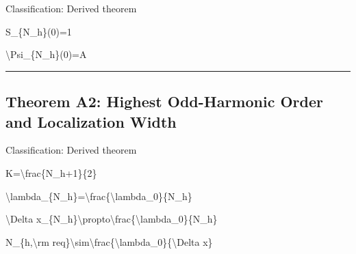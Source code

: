 \documentclass[
  a4paper]{article}
\newenvironment{Shaded}{}{}
\newcommand{\NormalTok}[1]{#1}
\begin{document}
Classification: Derived theorem

\begin{Shaded}
\begin{Highlighting}[]
\NormalTok{S\_\{N\_h\}(0)=1}
\end{Highlighting}
\end{Shaded}

\begin{Shaded}
\begin{Highlighting}[]
\NormalTok{\textbackslash{}Psi\_\{N\_h\}(0)=A}
\end{Highlighting}
\end{Shaded}

\begin{center}\rule{0.5\linewidth}{0.5pt}\end{center}

\subsection{Theorem A2: Highest Odd-Harmonic Order and Localization
Width}\label{theorem-a2-highest-odd-harmonic-order-and-localization-width}

Classification: Derived theorem

\begin{Shaded}
\begin{Highlighting}[]
\NormalTok{K=\textbackslash{}frac\{N\_h+1\}\{2\}}
\end{Highlighting}
\end{Shaded}

\begin{Shaded}
\begin{Highlighting}[]
\NormalTok{\textbackslash{}lambda\_\{N\_h\}=\textbackslash{}frac\{\textbackslash{}lambda\_0\}\{N\_h\}}
\end{Highlighting}
\end{Shaded}

\begin{Shaded}
\begin{Highlighting}[]
\NormalTok{\textbackslash{}Delta x\_\{N\_h\}\textbackslash{}propto\textbackslash{}frac\{\textbackslash{}lambda\_0\}\{N\_h\}}
\end{Highlighting}
\end{Shaded}

\begin{Shaded}
\begin{Highlighting}[]
\NormalTok{N\_\{h,\textbackslash{}rm req\}\textbackslash{}sim\textbackslash{}frac\{\textbackslash{}lambda\_0\}\{\textbackslash{}Delta x\}}
\end{Highlighting}
\end{Shaded}
\end{document}
